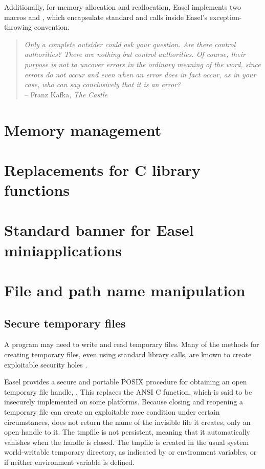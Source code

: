 Additionally, for memory allocation and reallocation, Easel implements
two macros  and , which
encapsulate standard  and  calls
inside Easel's exception-throwing convention.


\vspace*{\fill}
\begin{quote}
\emph{Only a complete outsider could ask your question. Are there
control authorities? There are nothing but control authorities. Of
course, their purpose is not to uncover errors in the ordinary meaning
of the word, since errors do not occur and even when an error does in
fact occur, as in your case, who can say conclusively that it is an
error?}\\ \hspace*{\fill} -- Franz Kafka, \emph{The Castle}
\end{quote}     


\section{Memory management}


\section{Replacements for C library functions}


\section{Standard banner for Easel miniapplications}


\section{File and path name manipulation}


\subsection{Secure temporary files}

A program may need to write and read temporary files.  Many of the
methods for creating temporary files, even using standard library
calls, are known to create exploitable security holes
\citep{Wheeler03,ChenDeanWagner04}.

Easel provides a secure and portable POSIX procedure for obtaining an
open temporary file handle, . This replaces the
ANSI C  function, which is said to be insecurely
implemented on some platforms.  Because closing and reopening a
temporary file can create an exploitable race condition under certain
circumstances,  does not return the name of the
invisible file it creates, only an open  handle to
it. The tmpfile is not persistent, meaning that it automatically
vanishes when the  handle is closed. The tmpfile is
created in the usual system world-writable temporary directory, as
indicated by  or  environment variables, or
 if neither environment variable is defined.


